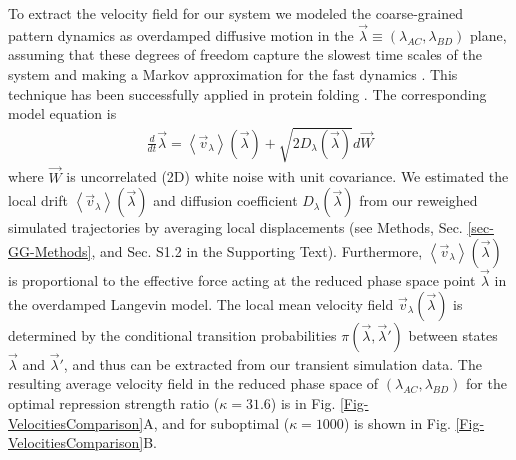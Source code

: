 \documentclass[a4paper,10pt]{article}
\newcommand{\GA}{A\xspace}
\newcommand{\GB}{B\xspace}
\newcommand{\GD}{D\xspace}
\newcommand{\vecA}[1]{\vec{#1}}
\newcommand{\avg}[1]{\left\langle #1\right\rangle}
\newcommand{\SI}{Supporting Text\xspace}
\begin{document}
To extract the velocity field for our system we modeled the coarse-grained pattern dynamics as overdamped  diffusive motion in the $\vecA \lambda \equiv (\lambda_{AC}, \lambda_{BD})$ plane, assuming that these degrees of freedom capture the slowest time scales of the system and making a Markov approximation for the fast dynamics \cite{Zwanzig1961, Mori1965}.  
This technique has been successfully applied in protein folding \cite{Yang2006, Kopelevich2005, Hummer2003, Plotkin1998}.
The corresponding model equation is
\begin{align}
 \frac{d}{dt} \vecA \lambda  = \avg{\vecA v_\lambda}(\vecA \lambda) + \sqrt{2D_\lambda(\vecA \lambda)} d\vecA W
\end{align}
where $\vecA W$ is uncorrelated (2D) white noise with unit covariance.
We estimated the local drift $\avg{\vecA v_\lambda}(\vecA \lambda)$ and diffusion coefficient $D_\lambda(\vecA \lambda)$ from our reweighed simulated trajectories by averaging local displacements (see Methods, Sec. \ref{sec-GG-Methods}, and Sec. S1.2 in the \SI).
Furthermore, $\avg{\vecA v_\lambda}(\vecA \lambda)$ is proportional to the effective force acting at the reduced phase space point $\vecA \lambda$ in the overdamped Langevin model.
The local mean velocity field $\vecA v_\lambda(\vecA \lambda)$ is determined by 
the conditional transition probabilities $\pi(\vecA \lambda, \vecA \lambda')$ 
between states $\vecA \lambda$ and $\vecA \lambda'$, and thus can be extracted from our transient simulation data. The resulting average velocity field in the reduced phase space of $(\lambda_{AC},\lambda_{BD})$ for the optimal repression strength ratio ($\kappa=31.6$) is in Fig. \ref{Fig-VelocitiesComparison}A, and for suboptimal ($\kappa=1000$) is shown in Fig. \ref{Fig-VelocitiesComparison}B.
\end{document}
